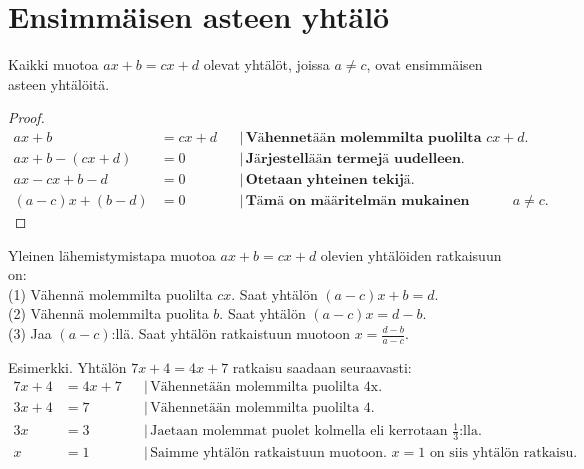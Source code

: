 \chapter{Ensimmäisen asteen yhtälö}


\begin{theorem}
Kaikki muotoa $ax+b=cx+d$ olevat yhtälöt, joissa $a \neq c$, ovat ensimmäisen asteen yhtälöitä.
\end{theorem}

\begin{proof}
\begin{align*}
ax+b &= cx+d & &| \, \textbf{Vähennetään molemmilta puolilta $cx+d$.} \\
ax+b - (cx+d) &= 0 & &| \, \textbf{Järjestellään termejä uudelleen.} \\
ax - cx + b - d &= 0 & &| \, \textbf{Otetaan yhteinen tekijä.} \\
(a-c)x + (b-d) &= 0 & &| \, \textbf{Tämä on määritelmän mukainen ensimmäisen asteen yhtälö, koska $a \neq c$.}
\end{align*}
\end{proof}

\begin{theorem}
Yleinen lähemistymistapa muotoa $ax+b = cx+d$ olevien yhtälöiden ratkaisuun on: \\
(1) Vähennä molemmilta puolilta $cx$. Saat yhtälön $(a-c)x + b = d$. \\
(2) Vähennä molemmilta puolita $b$. Saat yhtälön $(a-c)x = d-b$. \\
(3) Jaa $(a-c)$:llä. Saat yhtälön ratkaistuun muotoon $x = \frac{d-b}{a-c}$.
\end{theorem}

Esimerkki. Yhtälön $7x+4=4x+7$ ratkaisu saadaan seuraavasti:
\begin{align*}
7x+4 &= 4x+7 & &| \, \text{Vähennetään molemmilta puolilta 4x.} \\
3x+4 &= 7 & &| \, \text{Vähennetään molemmilta puolilta 4.} \\
3x &= 3 & &| \, \text{Jaetaan molemmat puolet kolmella eli kerrotaan $\frac{1}{3}$:lla.} \\
x &= 1 & &| \, \text{Saimme yhtälön ratkaistuun muotoon. $x=1$ on siis yhtälön ratkaisu.} \\
\end{align*}

